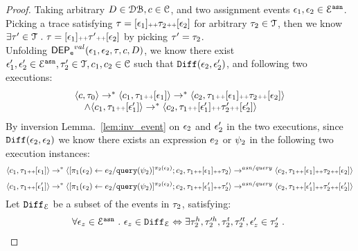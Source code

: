 \begin{proof}
Taking arbitrary $D \in \dbdom , c \in \cdom$, and two assignment events $\event_1, \event_2\in \eventset^{\asn}$.
\\
Picking a trace satisfying $\trace = [\event_1] \tracecat \trace_2 \tracecat [\event_2]$ for arbitrary $\trace_2 \in \mathcal{T}$,
 then we know 
\\
$\exists \trace' \in \mathcal{T} \st \trace = [\event_1] \tracecat \trace' \tracecat [\event_2]$ by picking $\trace' = \trace_2$.
\\
Unfolding $\eventdep^{val}(\event_1, \event_2, \trace, c, D)$, we know there exist $ \event_1', \event_2' \in \eventset^{\asn},
\trace_2' \in \mathcal{T}, c_1, c_2 \in \cdom$ such that 
$\diff(\event_2, \event_2')$,
 and following two executions:
%
\[
\begin{array}{l}
\config{c, \trace_0} \rightarrow^{*}
\config{c_1, \trace_1 \tracecat [\event_1]} \rightarrow^{*} \config{c_2, \trace_1 \tracecat [\event_1] \tracecat \trace_2 \tracecat [\event_2]} 
\\ \quad
\land
\config{c_1, \trace_1 \tracecat [\event_1']} \rightarrow^{*} \config{c_2, \trace_1 \tracecat [\event_1'] \tracecat \trace_2' \tracecat [\event_2']} 
\end{array}
\]
%
%
By inversion Lemma.~\ref{lem:inv_event} on $\event_2$ and $\event_2'$ in the two executions, 
since $\diff(\event_2, \event_2)$ we know there exists an expression $\expr_2$ or $\qexpr_2$ in the following two execution instances:
\[
\config{c_1, \trace_1 \tracecat [\event_1]} \rightarrow^{*} \config{[\assign{\pi_1(\event_2)}{\expr_2 / \query(\qexpr_2)}]{}^{\pi_2(\event_2)};c_2, \trace_1 \tracecat [\event_1] \tracecat \trace_2} 
\rightarrow^{asn / query} \config{c_2, \trace_1 \tracecat [\event_1] \tracecat \trace_2 \tracecat [\event_2]}  
\]
%
\[
\config{c_1, \trace_1 \tracecat [\event_1']} \rightarrow^{*} \config{[\assign{\pi_1(\event_2)}{\expr_2 / \query(\qexpr_2)}]{}^{\pi_2(\event_2)};c_2, \trace_1 \tracecat [\event_1'] \tracecat \trace_2'} 
\rightarrow^{asn / query} \config{c_2, \trace_1 \tracecat [\event_1'] \tracecat \trace_2' \tracecat [\event_2']}  
\]
%
Let $\diff_{\eventset}$ be a subset of the events in $\trace_2$, satisfying: 
\[
	\begin{array}{l}
		\forall \event_z \in \eventset^{\asn} \st 
	\event_z \in \diff_{\eventset} \Leftrightarrow 
	\exists \trace_2^h, \trace'^h_2, \trace_2^t, \trace'^t_2, \event_z' \in \trace_2' \st 

\end{array}\]
\end{proof}
